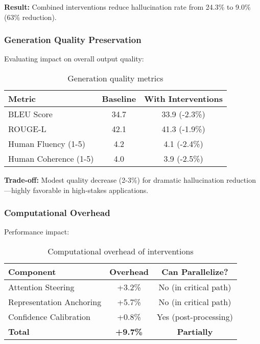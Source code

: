 \documentclass[11pt]{article}
\begin{document}
\textbf{Result:} Combined interventions reduce hallucination rate from 24.3\% to 9.0\% (63\% reduction).

\subsubsection{Generation Quality Preservation}

Evaluating impact on overall output quality:

\begin{table}[H]
\centering
\begin{tabular}{@{}lcc@{}}
\toprule
\textbf{Metric} & \textbf{Baseline} & \textbf{With Interventions} \\ \midrule
BLEU Score & 34.7 & 33.9 (-2.3\%) \\
ROUGE-L & 42.1 & 41.3 (-1.9\%) \\
Human Fluency (1-5) & 4.2 & 4.1 (-2.4\%) \\
Human Coherence (1-5) & 4.0 & 3.9 (-2.5\%) \\ \bottomrule
\end{tabular}
\caption{Generation quality metrics}
\end{table}

\textbf{Trade-off:} Modest quality decrease (2-3\%) for dramatic hallucination reduction---highly favorable in high-stakes applications.

\subsubsection{Computational Overhead}

Performance impact:

\begin{table}[H]
\centering
\begin{tabular}{@{}lcc@{}}
\toprule
\textbf{Component} & \textbf{Overhead} & \textbf{Can Parallelize?} \\ \midrule
Attention Steering & +3.2\% & No (in critical path) \\
Representation Anchoring & +5.7\% & No (in critical path) \\
Confidence Calibration & +0.8\% & Yes (post-processing) \\
\textbf{Total} & \textbf{+9.7\%} & \textbf{Partially} \\ \bottomrule
\end{tabular}
\caption{Computational overhead of interventions}
\end{table}
\end{document}
